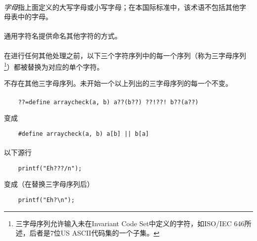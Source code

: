 \paragraph{}
\textit{字母}指上面定义的大写字母或小写字母；在本国际标准中，该术语不包括其他字
母表中的字母。

\paragraph{}
通用字符名提供命名其他字符的方式。


\paragraph{}
在进行任何其他处理之前，以下三个字符序列中的每一个序列（称为三字母序列
\footnote{三字母序列允许输入未在Invariant Code Set中定义的字符，如ISO/IEC 646所
述，后者是$7$位US ASCII代码集的一个子集。}）都被替换为对应的单个字符。

\mbox{\qquad\tm{??=\quad\#\qquad\qquad??)\quad]\qquad\qquad??!\quad|}}

\mbox{\qquad\tm{??(\quad[\qquad\qquad??\sq\quad\^\qquad\qquad??>\quad\}}}

\mbox{\qquad{}}

不存在其他三字母序列。未开始一个以上列出的三字母序列的每一个不变。

\paragraph{}
\ex
\begin{lstlisting}
    ??=define arraycheck(a, b) a??(b??) ??!??! b??(a??)
\end{lstlisting}
变成
\begin{lstlisting}
    #define arraycheck(a, b) a[b] || b[a]
\end{lstlisting}

\paragraph{}
\ex 以下源行
\begin{lstlisting}
    printf("Eh???/n");
\end{lstlisting}
变成（在替换三字母序列后）
\begin{lstlisting}
    printf("Eh?\n");
\end{lstlisting}

